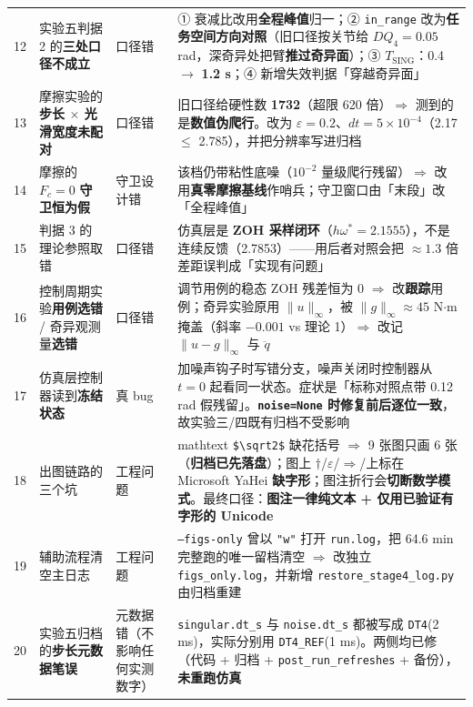 \documentclass[11pt,a4paper]{ctexart}
\begin{document}
\begin{table}[H]
{\begin{tabular}{@{}c p{5.2cm} p{1.9cm} p{6.2cm}@{}}
12 & 实验五判据 2 的\textbf{三处口径不成立} & 口径错 & ① 衰减比改用\textbf{全程峰值}归一；② \texttt{in\_range} 改为\textbf{任务空间方向对照}（旧口径按关节给 $DQ_4=0.05$ rad，深奇异处把臂\textbf{推过奇异面}）；③ $T_{\text{SING}}$：0.4 $\to$ \textbf{1.2 s}；④ 新增失效判据「穿越奇异面」 \\
13 & 摩擦实验的\textbf{步长 $\times$ 光滑宽度未配对} & 口径错 & 旧口径给硬性数 \textbf{1732}（超限 620 倍）$\Rightarrow$ 测到的是\textbf{数值伪爬行}。改为 $\varepsilon=0.2$、$dt=5\times10^{-4}$（2.17 $\le$ 2.785），并把分辨率写进归档 \\
14 & 摩擦的 $F_c=0$ \textbf{守卫恒为假} & 守卫设计错 & 该档仍带粘性底噪（$10^{-2}$ 量级爬行残留）$\Rightarrow$ 改用\textbf{真零摩擦基线}作哨兵；守卫窗口由「末段」改「全程峰值」 \\
15 & 判据 3 的理论参照取错 & 口径错 & 仿真层是 \textbf{ZOH 采样闭环}（$h\omega^*=2.1555$），不是连续反馈（2.7853）——用后者对照会把 $\approx1.3$ 倍差距误判成「实现有问题」 \\
16 & 控制周期实验\textbf{用例选错} / 奇异观测量\textbf{选错} & 口径错 & 调节用例的稳态 ZOH 残差恒为 0 $\Rightarrow$ 改\textbf{跟踪}用例；奇异实验原用 $\|u\|_\infty$，被 $\|g\|_\infty\approx45$ N$\cdot$m 掩盖（斜率 $-0.001$ vs 理论 1）$\Rightarrow$ 改记 $\|u-g\|_\infty$ 与 $\ddot q$ \\
17 & 仿真层控制器读到\textbf{冻结状态} & 真 bug & 加噪声钩子时写错分支，噪声关闭时控制器从 $t=0$ 起看同一状态。症状是「标称对照点带 0.12 rad 假残留」。\textbf{\texttt{noise=None} 时修复前后逐位一致}，故实验三/四既有归档不受影响 \\
18 & 出图链路的三个坑 & 工程问题 & mathtext \texttt{\$\textbackslash sqrt2\$} 缺花括号 $\Rightarrow$ 9 张图只画 6 张（\textbf{归档已先落盘}）；图上 $\dag$/$\varepsilon$/$\Rightarrow$/上标在 Microsoft YaHei \textbf{缺字形}；图注折行会\textbf{切断数学模式}。最终口径：\textbf{图注一律纯文本 + 仅用已验证有字形的 Unicode} \\
19 & 辅助流程清空主日志 & 工程问题 & \texttt{--figs-only} 曾以 \texttt{"w"} 打开 \texttt{run.log}，把 64.6 min 完整跑的唯一留档清空 $\Rightarrow$ 改独立 \texttt{figs\_only.log}，并新增 \texttt{restore\_stage4\_log.py} 由归档重建 \\
20 & 实验五归档的\textbf{步长元数据笔误} & 元数据错（不影响任何实测数字） & \texttt{singular.dt\_s} 与 \texttt{noise.dt\_s} 都被写成 \texttt{DT4}(2 ms)，实际分别用 \texttt{DT4\_REF}(1 ms)。两侧均已修（代码 + 归档 + \texttt{post\_run\_refreshes} + 备份），\textbf{未重跑仿真} \\
\bottomrule
\end{tabular}%
}
\end{table}
\end{document}

